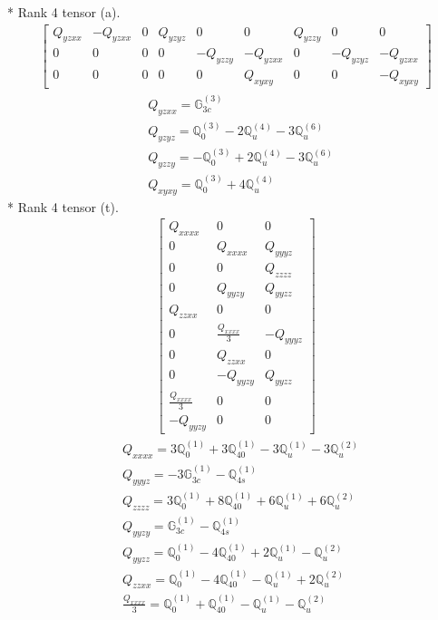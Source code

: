 \documentclass[fleqn,8pt,landscape]{jsarticle}
\begin{document}
* Rank 4 tensor (a).
\begin{align*}
\begin{bmatrix} Q_{yzxx} & - Q_{yzxx} & 0 & Q_{yzyz} & 0 & 0 & Q_{yzzy} & 0 & 0 \\ 0 & 0 & 0 & 0 & - Q_{yzzy} & - Q_{yzxx} & 0 & - Q_{yzyz} & - Q_{yzxx} \\ 0 & 0 & 0 & 0 & 0 & Q_{xyxy} & 0 & 0 & - Q_{xyxy} \end{bmatrix}
\end{align*}
\begin{align*}
& Q_{yzxx} = \mathbb{G}_{3c}^{(3)} \\
& Q_{yzyz} = \mathbb{Q}_{0}^{(3)} - 2 \mathbb{Q}_{u}^{(4)} - 3 \mathbb{Q}_{u}^{(6)} \\
& Q_{yzzy} = - \mathbb{Q}_{0}^{(3)} + 2 \mathbb{Q}_{u}^{(4)} - 3 \mathbb{Q}_{u}^{(6)} \\
& Q_{xyxy} = \mathbb{Q}_{0}^{(3)} + 4 \mathbb{Q}_{u}^{(4)}
\end{align*}
* Rank 4 tensor (t).
\begin{align*}
\begin{bmatrix} Q_{xxxx} & 0 & 0 \\ 0 & Q_{xxxx} & Q_{yyyz} \\ 0 & 0 & Q_{zzzz} \\ 0 & Q_{yyzy} & Q_{yyzz} \\ Q_{zzxx} & 0 & 0 \\ 0 & \frac{Q_{xxxx}}{3} & - Q_{yyyz} \\ 0 & Q_{zzxx} & 0 \\ 0 & - Q_{yyzy} & Q_{yyzz} \\ \frac{Q_{xxxx}}{3} & 0 & 0 \\ - Q_{yyzy} & 0 & 0 \end{bmatrix}
\end{align*}
\begin{align*}
& Q_{xxxx} = 3 \mathbb{Q}_{0}^{(1)} + 3 \mathbb{Q}_{40}^{(1)} - 3 \mathbb{Q}_{u}^{(1)} - 3 \mathbb{Q}_{u}^{(2)} \\
& Q_{yyyz} = - 3 \mathbb{G}_{3c}^{(1)} - \mathbb{Q}_{4s}^{(1)} \\
& Q_{zzzz} = 3 \mathbb{Q}_{0}^{(1)} + 8 \mathbb{Q}_{40}^{(1)} + 6 \mathbb{Q}_{u}^{(1)} + 6 \mathbb{Q}_{u}^{(2)} \\
& Q_{yyzy} = \mathbb{G}_{3c}^{(1)} - \mathbb{Q}_{4s}^{(1)} \\
& Q_{yyzz} = \mathbb{Q}_{0}^{(1)} - 4 \mathbb{Q}_{40}^{(1)} + 2 \mathbb{Q}_{u}^{(1)} - \mathbb{Q}_{u}^{(2)} \\
& Q_{zzxx} = \mathbb{Q}_{0}^{(1)} - 4 \mathbb{Q}_{40}^{(1)} - \mathbb{Q}_{u}^{(1)} + 2 \mathbb{Q}_{u}^{(2)} \\
& \frac{Q_{xxxx}}{3} = \mathbb{Q}_{0}^{(1)} + \mathbb{Q}_{40}^{(1)} - \mathbb{Q}_{u}^{(1)} - \mathbb{Q}_{u}^{(2)}
\end{align*}
\end{document}
